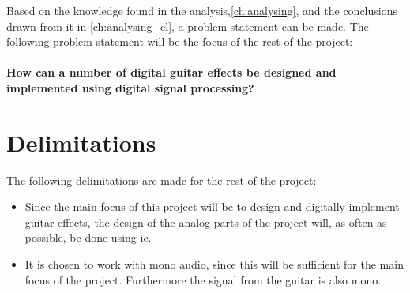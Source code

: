 Based on the knowledge found in the analysis,\autoref{ch:analysing}, and the conclusions drawn from it in \autoref{ch:analysing_cl}, a problem statement can be made. The following problem statement will be the focus of the rest of the project:
\\
\\
\textbf{How can a number of digital guitar effects be designed and implemented using digital signal processing?}
\section{Delimitations}
The following delimitations are made for the rest of the project:

\begin{itemize}
\item Since the main focus of this project will be to design and digitally implement guitar effects, the design of the analog parts of the project will, as often as possible, be done using \gls{ic}. 
\item It is chosen to work with mono audio, since this will be sufficient for the main focus of the project. Furthermore the signal from the guitar is also mono. 
\end{itemize} 
 
